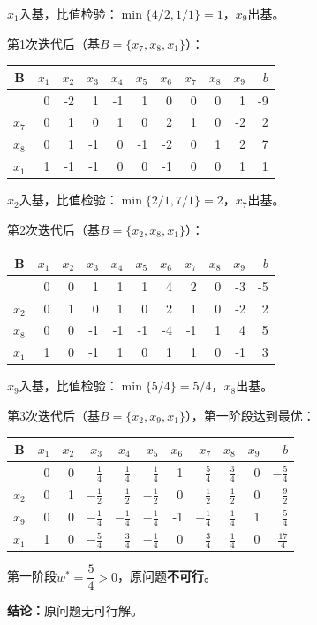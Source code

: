 \documentclass[12pt,a4paper]{article}
\begin{document}
$x_1$入基，比值检验：$\min\{4/2, 1/1\} = 1$，$x_9$出基。

第1次迭代后（基$B = \{x_7, x_8, x_1\}$）：

\begin{center}
\begin{tabular}{|c|rrrrrrrrr|r|}
\hline
B & $x_1$ & $x_2$ & $x_3$ & $x_4$ & $x_5$ & $x_6$ & $x_7$ & $x_8$ & $x_9$ & $b$ \\
\hline
 & 0 & -2 & 1 & -1 & 1 & 0 & 0 & 0 & 1 & -9 \\
\hline
$x_7$ & 0 & 1 & 0 & 1 & 0 & 2 & 1 & 0 & -2 & 2 \\
$x_8$ & 0 & 1 & -1 & 0 & -1 & -2 & 0 & 1 & 2 & 7 \\
$x_1$ & 1 & -1 & -1 & 0 & 0 & -1 & 0 & 0 & 1 & 1 \\
\hline
\end{tabular}
\end{center}

$x_2$入基，比值检验：$\min\{2/1, 7/1\} = 2$，$x_7$出基。

第2次迭代后（基$B = \{x_2, x_8, x_1\}$）：

\begin{center}
\begin{tabular}{|c|rrrrrrrrr|r|}
\hline
B & $x_1$ & $x_2$ & $x_3$ & $x_4$ & $x_5$ & $x_6$ & $x_7$ & $x_8$ & $x_9$ & $b$ \\
\hline
 & 0 & 0 & 1 & 1 & 1 & 4 & 2 & 0 & -3 & -5 \\
\hline
$x_2$ & 0 & 1 & 0 & 1 & 0 & 2 & 1 & 0 & -2 & 2 \\
$x_8$ & 0 & 0 & -1 & -1 & -1 & -4 & -1 & 1 & 4 & 5 \\
$x_1$ & 1 & 0 & -1 & 1 & 0 & 1 & 1 & 0 & -1 & 3 \\
\hline
\end{tabular}
\end{center}

$x_9$入基，比值检验：$\min\{5/4\} = 5/4$，$x_8$出基。

第3次迭代后（基$B = \{x_2, x_9, x_1\}$），第一阶段达到最优：

\begin{center}
\begin{tabular}{|c|rrrrrrrrr|r|}
\hline
B & $x_1$ & $x_2$ & $x_3$ & $x_4$ & $x_5$ & $x_6$ & $x_7$ & $x_8$ & $x_9$ & $b$ \\
\hline
 & 0 & 0 & $\frac{1}{4}$ & $\frac{1}{4}$ & $\frac{1}{4}$ & 1 & $\frac{5}{4}$ & $\frac{3}{4}$ & 0 & $-\frac{5}{4}$ \\
\hline
$x_2$ & 0 & 1 & $-\frac{1}{2}$ & $\frac{1}{2}$ & $-\frac{1}{2}$ & 0 & $\frac{1}{2}$ & $\frac{1}{2}$ & 0 & $\frac{9}{2}$ \\
$x_9$ & 0 & 0 & $-\frac{1}{4}$ & $-\frac{1}{4}$ & $-\frac{1}{4}$ & -1 & $-\frac{1}{4}$ & $\frac{1}{4}$ & 1 & $\frac{5}{4}$ \\
$x_1$ & 1 & 0 & $-\frac{5}{4}$ & $\frac{3}{4}$ & $-\frac{1}{4}$ & 0 & $\frac{3}{4}$ & $\frac{1}{4}$ & 0 & $\frac{17}{4}$ \\
\hline
\end{tabular}
\end{center}

第一阶段$w^* = \dfrac{5}{4} > 0$，原问题\textbf{不可行}。

\textbf{结论：}原问题无可行解。
\end{document}
